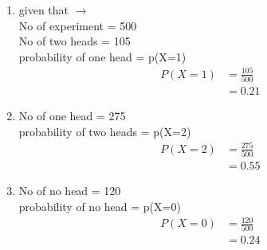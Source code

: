 \renewcommand{\theequation}{\theenumi}
\begin{enumerate}[label=\arabic*.,ref=\thesubsection.\theenumi]
\item given that $\to$
\\
No of experiment = 500
\\
No of two heads = 105
\\
probability of one head = p(X=1)
\begin{align}
P\left(X=1\right) &= \frac{105}{500}
\\
&= 0.21
\end{align}
\item
No of one head = 275
\\
probability of two heads = p(X=2)
\begin{align}
P\left(X=2\right) &= \frac{275}{500}
\\
&= 0.55
\end{align}
\item
No of no head = 120
\\
probability of no head = p(X=0)
\begin{align}
P\left(X=0\right) &= \frac{120}{500}
\\
&= 0.24
\end{align}
\end{enumerate}